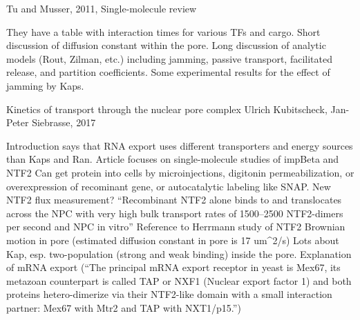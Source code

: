 Tu and Musser, 2011, Single-molecule review

They have a table with interaction times for various TFs and cargo.
Short discussion of diffusion constant within the pore.
Long discussion of analytic models (Rout, Zilman, etc.) including jamming, passive transport, facilitated release, and partition coefficients.
Some experimental results for the effect of jamming by Kaps.

Kinetics of transport through the nuclear pore complex
Ulrich Kubitscheck, Jan-Peter Siebrasse, 2017

Introduction says that RNA export uses different transporters and energy sources than Kaps and Ran.
Article focuses on single-molecule studies of impBeta and NTF2
Can get protein into cells by microinjections, digitonin permeabilization, or overexpression of recominant gene, or autocatalytic labeling like SNAP.
New NTF2 flux measurement? ``Recombinant NTF2 alone binds to and translocates across the NPC with very high bulk transport rates of 1500–2500 NTF2-dimers per second and NPC in vitro''
Reference to Herrmann study of NTF2 Brownian motion in pore (estimated diffusion constant in pore is 17 um^2/s)
Lots about Kap, esp. two-population (strong and weak binding) inside the pore.
Explanation of mRNA export (``The principal mRNA export receptor in yeast is Mex67, its metazoan counterpart is called TAP or NXF1 (Nuclear export factor 1) and both proteins hetero-dimerize via their NTF2-like domain with a small interaction partner: Mex67 with Mtr2 and TAP with NXT1/p15.'')